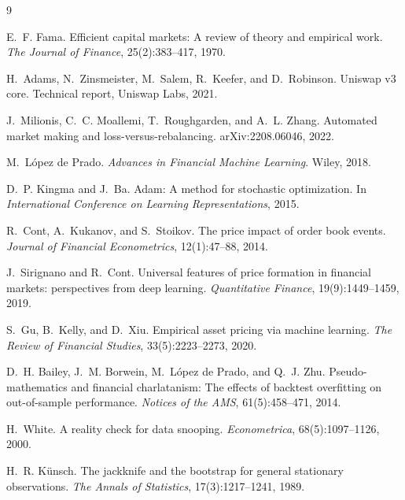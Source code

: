 \documentclass[11pt,a4paper]{article}
\begin{document}
\begin{thebibliography}{9}

E.~F. Fama.
\newblock Efficient capital markets: A review of theory and empirical work.
\newblock \emph{The Journal of Finance}, 25(2):383--417, 1970.

H.~Adams, N.~Zinsmeister, M.~Salem, R.~Keefer, and D.~Robinson.
\newblock Uniswap v3 core.
\newblock Technical report, Uniswap Labs, 2021.

J.~Milionis, C.~C. Moallemi, T.~Roughgarden, and A.~L. Zhang.
\newblock Automated market making and loss-versus-rebalancing.
\newblock arXiv:2208.06046, 2022.

M.~L\'opez de Prado.
\newblock \emph{Advances in Financial Machine Learning}.
\newblock Wiley, 2018.

D.~P. Kingma and J.~Ba.
\newblock Adam: A method for stochastic optimization.
\newblock In \emph{International Conference on Learning Representations}, 2015.

R.~Cont, A.~Kukanov, and S.~Stoikov.
\newblock The price impact of order book events.
\newblock \emph{Journal of Financial Econometrics}, 12(1):47--88, 2014.

J.~Sirignano and R.~Cont.
\newblock Universal features of price formation in financial markets:
  perspectives from deep learning.
\newblock \emph{Quantitative Finance}, 19(9):1449--1459, 2019.

S.~Gu, B.~Kelly, and D.~Xiu.
\newblock Empirical asset pricing via machine learning.
\newblock \emph{The Review of Financial Studies}, 33(5):2223--2273, 2020.

D.~H. Bailey, J.~M. Borwein, M.~L\'opez de Prado, and Q.~J. Zhu.
\newblock Pseudo-mathematics and financial charlatanism: The effects of
  backtest overfitting on out-of-sample performance.
\newblock \emph{Notices of the AMS}, 61(5):458--471, 2014.

H.~White.
\newblock A reality check for data snooping.
\newblock \emph{Econometrica}, 68(5):1097--1126, 2000.

H.~R. K\"unsch.
\newblock The jackknife and the bootstrap for general stationary observations.
\newblock \emph{The Annals of Statistics}, 17(3):1217--1241, 1989.

\end{thebibliography}
\end{document}
